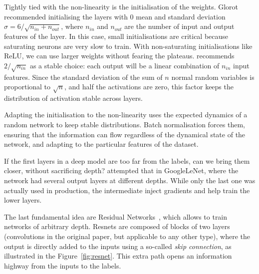 Tightly tied  with the non-linearity is the initialisation of the weights.
Glorot recommended initialising the layers with 0 mean and standard deviation $\sigma=6/\sqrt{n_{in}+ n_{out}}$, where $n_{in}$ and $n_{out}$ are the number of input and output features of the layer.
In this case, small initialisations are critical because saturating neurons are very slow to train.
With non-saturating initialisations like ReLU, we can use larger weights without fearing the plateaus.
\citet{he} recommends $2/\sqrt{n_{in}}$ as a stable choice: each output will be a linear combination of $n_{in}$ input features.
Since the standard deviation of the sum of $n$ normal random variables is proportional to $\sqrt{n}$, and half the activations are zero, this factor keeps the distribution of activation stable across layers.

Adapting the initialisation  to the non-linearity uses the expected dynamics of a random network to keep stable distributions.
Batch normalisation forces them, ensuring that the information can flow regardless of the dynamical state of the network, and adapting to the particular features of the dataset.

If the first layers  in a deep model are
too far from the labels, can we bring them closer, without sacrificing depth?
\citet{googlenet} attempted that in GoogleLeNet, where the network had several output layers at different depths.
While only the last one was actually used in production, the intermediate inject gradients and help train the lower layers.

The last fundamental idea  are Residual Networks~\citep{resnet}, which allows to train networks of arbitrary depth.
Resnets are composed of blocks of two layers (convolutions in the original paper, but applicable to any other type), where the output is directly added to the inputs using a so-called \emph{skip connection}, as illustrated in the Figure~\ref{fig:resnet}.
This extra path opens an information highway from the inputs to the labels.

